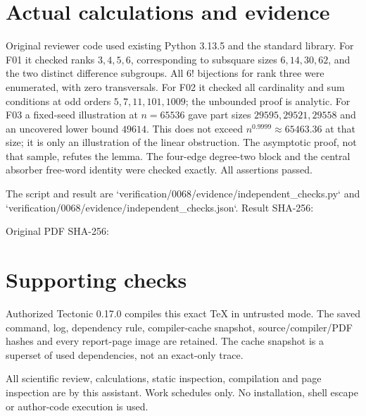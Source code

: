 \documentclass[10pt]{article}
\begin{document}
\section*{Actual calculations and evidence}
Original reviewer code used existing Python 3.13.5 and the standard library. For F01 it checked ranks \(3,4,5,6\), corresponding to subsquare sizes \(6,14,30,62\), and the two distinct difference subgroups. All \(6!\) bijections for rank three were enumerated, with zero transversals. For F02 it checked all cardinality and sum conditions at odd orders \(5,7,11,101,1009\); the unbounded proof is analytic. For F03 a fixed-seed illustration at \(n=65536\) gave part sizes \(29595,29521,29558\) and an uncovered lower bound \(49614\). This does not exceed \(n^{0.9999}\approx65463.36\) at that size; it is only an illustration of the linear obstruction. The asymptotic proof, not that sample, refutes the lemma. The four-edge degree-two block and the central absorber free-word identity were checked exactly. All assertions passed.\par
The script and result are `verification/0068/evidence/independent\_checks.py` and `verification/0068/evidence/independent\_checks.json`. Result SHA-256:\par
Original PDF SHA-256:\par
\section*{Supporting checks}
Authorized Tectonic 0.17.0 compiles this exact TeX in untrusted mode. The saved command, log, dependency rule, compiler-cache snapshot, source/compiler/PDF hashes and every report-page image are retained. The cache snapshot is a superset of used dependencies, not an exact-only trace.\par
All scientific review, calculations, static inspection, compilation and page inspection are by this assistant. Work schedules only. No installation, shell escape or author-code execution is used.\par
\end{document}
